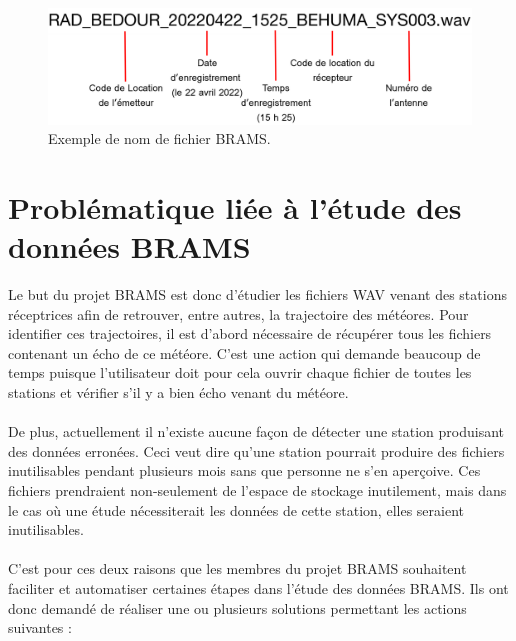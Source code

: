 \documentclass[11pt]{article}
\begin{document}
\begin{figure}[t]
    \begin{center}
        \includegraphics[scale=0.15]{file_name.png}
        \caption{Exemple de nom de fichier BRAMS.}
        \label{fig:file_name_brams}
    \end{center}
\end{figure}

\newpage

\section{Problématique liée à l'étude des données BRAMS}

Le but du projet BRAMS est donc d'étudier les fichiers WAV venant des stations réceptrices afin de retrouver, entre autres, la trajectoire des météores.
Pour identifier ces trajectoires, il est d'abord nécessaire de récupérer tous les fichiers contenant un écho de ce météore.
C'est une action qui demande beaucoup de temps puisque l'utilisateur doit pour cela ouvrir chaque fichier de toutes les stations et vérifier s'il y a bien écho venant du météore.\\
\\
De plus, actuellement il n'existe aucune façon de détecter une station produisant des données erronées.
Ceci veut dire qu'une station pourrait produire des fichiers inutilisables pendant plusieurs mois sans que personne ne s'en aperçoive.
Ces fichiers prendraient non-seulement de l'espace de stockage inutilement, mais dans le cas où une étude nécessiterait les données de cette station, elles seraient inutilisables.\\
\\
C'est pour ces deux raisons que les membres du projet BRAMS souhaitent faciliter et automatiser certaines étapes dans l'étude des données BRAMS.
Ils ont donc demandé de réaliser une ou plusieurs solutions permettant les actions suivantes :
\end{document}
